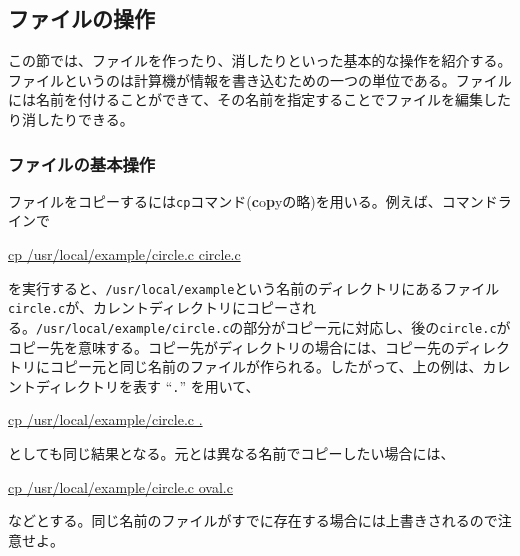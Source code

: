 \subsection{ファイルの操作}
\label{sec:unix:fileManagement}
この節では、ファイルを作ったり、消したりといった基本的な操作を紹介する。ファイルというのは計算機が情報を書き込むための一つの単位である。ファイルには名前を付けることができて、その名前を指定することでファイルを編集したり消したりできる。

\subsubsection*{ファイルの基本操作}
ファイルをコピーするには\texttt{cp}コマンド(\textbf{c}o\textbf{p}yの略)を用いる。例えば、コマンドラインで
\begin{commandline2}
    \prompt \underline{cp /usr/local/example/circle.c circle.c}
\end{commandline2} \noindent
を実行すると、\texttt{/usr/local/example}という名前のディレクトリにあるファイル\texttt{circle.c}が、カレントディレクトリにコピーされる。\texttt{/usr/local/example/circle.c}の部分がコピー元に対応し、後の\texttt{circle.c}がコピー先を意味する。コピー先がディレクトリの場合には、コピー先のディレクトリにコピー元と同じ名前のファイルが作られる。したがって、上の例は、カレントディレクトリを表す ``\texttt{.}'' を用いて、
\begin{commandline2}
    \prompt \underline{cp /usr/local/example/circle.c .}
\end{commandline2} \noindent
としても同じ結果となる。元とは異なる名前でコピーしたい場合には、
\begin{commandline2}
    \prompt \underline{cp /usr/local/example/circle.c oval.c}
\end{commandline2} \noindent
などとする。同じ名前のファイルがすでに存在する場合には上書きされるので注意せよ。

